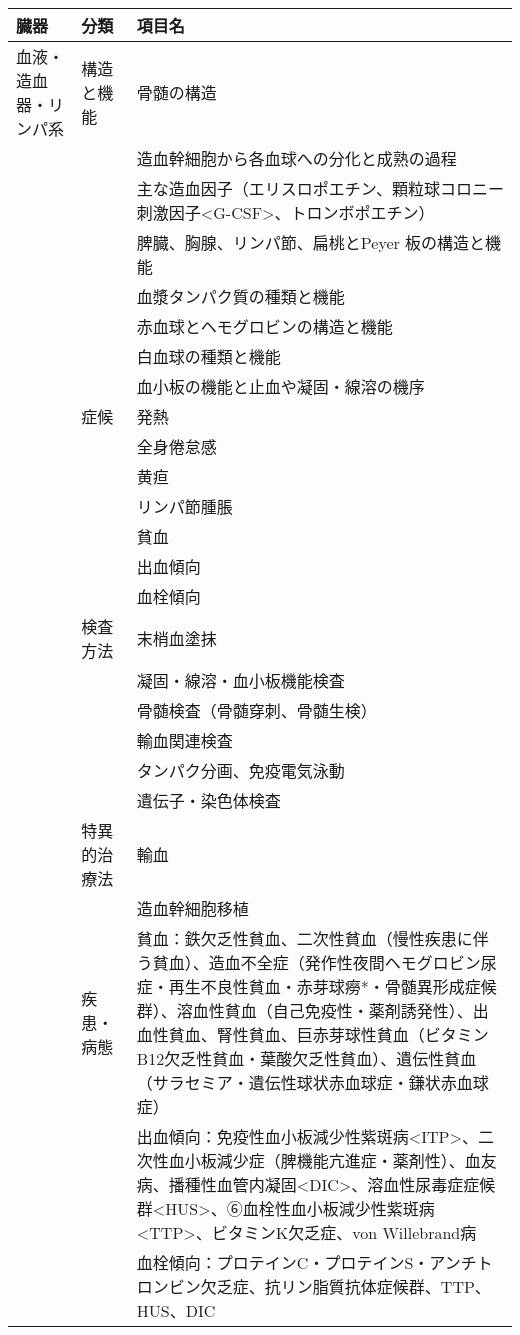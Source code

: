 \documentclass[
]{ltjsarticle}
\begin{document}
\begin{xltabular}{\linewidth}{XXX}
\caption{\label{tbl:知識}} \\
\toprule
臓器 & 分類 & 項目名 \\
\midrule
\endhead
血液・造血器・リンパ系 & 構造と機能 & 骨髄の構造 \\
 &  & 造血幹細胞から各血球への分化と成熟の過程 \\
 &  & 主な造血因子（エリスロポエチン、顆粒球コロニー刺激因子<G-CSF>、トロンボポエチン） \\
 &  & 脾臓、胸腺、リンパ節、扁桃とPeyer 板の構造と機能 \\
 &  & 血漿タンパク質の種類と機能 \\
 &  & 赤血球とヘモグロビンの構造と機能 \\
 &  & 白血球の種類と機能 \\
 &  & 血小板の機能と止血や凝固・線溶の機序 \\
 & 症候 & 発熱 \\
 &  & 全身倦怠感 \\
 &  & 黄疸 \\
 &  & リンパ節腫脹 \\
 &  & 貧血 \\
 &  & 出血傾向 \\
 &  & 血栓傾向 \\
 & 検査方法 & 末梢血塗抹 \\
 &  & 凝固・線溶・血小板機能検査 \\
 &  & 骨髄検査（骨髄穿刺、骨髄生検） \\
 &  & 輸血関連検査 \\
 &  & タンパク分画、免疫電気泳動 \\
 &  & 遺伝子・染色体検査 \\
 & 特異的治療法 & 輸血 \\
 &  & 造血幹細胞移植 \\
 & 疾患・病態 & 貧血：鉄欠乏性貧血、二次性貧血（慢性疾患に伴う貧血）、造血不全症（発作性夜間ヘモグロビン尿症・再生不良性貧血・赤芽球癆*・骨髄異形成症候群）、溶血性貧血（自己免疫性・薬剤誘発性）、出血性貧血、腎性貧血、巨赤芽球性貧血（ビタミンB12欠乏性貧血・葉酸欠乏性貧血）、遺伝性貧血（サラセミア・遺伝性球状赤血球症・鎌状赤血球症） \\
 &  & 出血傾向：免疫性血小板減少性紫斑病<ITP>、二次性血小板減少症（脾機能亢進症・薬剤性）、血友病、播種性血管内凝固<DIC>、溶血性尿毒症症候群<HUS>、➅血栓性血小板減少性紫斑病<TTP>、ビタミンK欠乏症、von Willebrand病 \\
 &  & 血栓傾向：プロテインC・プロテインS・アンチトロンビン欠乏症、抗リン脂質抗体症候群、TTP、HUS、DIC \\

\end{xltabular}
\end{document}
